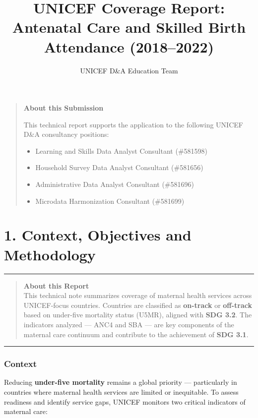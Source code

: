 \documentclass[
]{article}
\title{UNICEF Coverage Report: Antenatal Care and Skilled Birth
Attendance (2018--2022)}
\author{UNICEF D\&A Education Team}
\date{}
\begin{document}
\maketitle

\begin{quote}
\textbf{About this Submission}

This technical report supports the application to the following UNICEF
D\&A consultancy positions:

\begin{itemize}
\item
  Learning and Skills Data Analyst Consultant (\#581598)
\item
  Household Survey Data Analyst Consultant (\#581656)
\item
  Administrative Data Analyst Consultant (\#581696)
\item
  Microdata Harmonization Consultant (\#581699)
\end{itemize}
\end{quote}

\section{1. Context, Objectives and
Methodology}\label{context-objectives-and-methodology}

\begin{center}\rule{0.5\linewidth}{0.5pt}\end{center}

\begin{quote}
\textbf{About this Report}\\
This technical note summarizes coverage of maternal health services
across UNICEF-focus countries. Countries are classified as
\textbf{on-track} or \textbf{off-track} based on under-five mortality
status (U5MR), aligned with \textbf{SDG 3.2}. The indicators analyzed
--- ANC4 and SBA --- are key components of the maternal care continuum
and contribute to the achievement of \textbf{SDG 3.1}.
\end{quote}

\begin{center}\rule{0.5\linewidth}{0.5pt}\end{center}

\subsubsection{Context}\label{context}

Reducing \textbf{under-five mortality} remains a global priority ---
particularly in countries where maternal health services are limited or
inequitable. To assess readiness and identify service gaps, UNICEF
monitors two critical indicators of maternal care:
\end{document}
